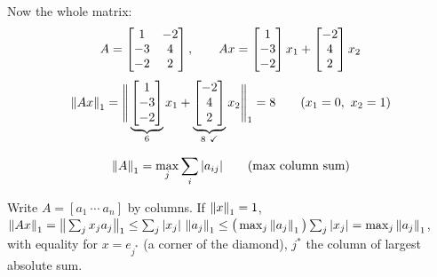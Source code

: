 Now the whole matrix:
\[
A = \begin{bmatrix}1 & -2\\ -3 & 4\\ -2 & 2\end{bmatrix}, \qquad
Ax = \begin{bmatrix}1\\ -3\\ -2\end{bmatrix}x_1 + \begin{bmatrix}-2\\ 4\\ 2\end{bmatrix}x_2
\]
\[
\left\lVert Ax \right\rVert_1 = \Bigg\|\underbrace{\begin{bmatrix}1\\ -3\\ -2\end{bmatrix}}_{6}x_1 + \underbrace{\begin{bmatrix}-2\\ 4\\ 2\end{bmatrix}}_{8\ \checkmark}x_2\Bigg\|_1 = 8
\qquad (x_1 = 0,\ x_2 = 1)
\]
\begin{keybox}
\[
\left\lVert A \right\rVert_1 = \max_j \sum_i |a_{ij}| \qquad \text{(max column sum)}
\]
\end{keybox}
\begin{insight}
Write $A = [a_1\ \cdots\ a_n]$ by columns. If $\left\lVert x \right\rVert_1 = 1$,
$\left\lVert Ax \right\rVert_1 = \big\|\sum_j x_j a_j\big\|_1 \le \sum_j |x_j|\,\left\lVert a_j \right\rVert_1 \le \big(\max_j\left\lVert a_j \right\rVert_1\big)\sum_j|x_j| = \max_j\left\lVert a_j \right\rVert_1$,
with equality for $x = e_{j^*}$ (a corner of the diamond), $j^*$ the column of largest absolute sum.
\end{insight}

